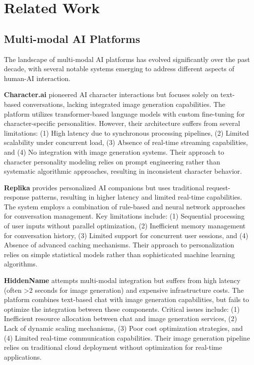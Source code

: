 \documentclass[conference]{IEEEtran}
\begin{document}
\section{Related Work}

\subsection{Multi-modal AI Platforms}
The landscape of multi-modal AI platforms has evolved significantly over the past decade, with several notable systems emerging to address different aspects of human-AI interaction.

\textbf{Character.ai} pioneered AI character interactions but focuses solely on text-based conversations, lacking integrated image generation capabilities. The platform utilizes transformer-based language models with custom fine-tuning for character-specific personalities. However, their architecture suffers from several limitations: (1) High latency due to synchronous processing pipelines, (2) Limited scalability under concurrent load, (3) Absence of real-time streaming capabilities, and (4) No integration with image generation systems. Their approach to character personality modeling relies on prompt engineering rather than systematic algorithmic approaches, resulting in inconsistent character behavior.

\textbf{Replika} provides personalized AI companions but uses traditional request-response patterns, resulting in higher latency and limited real-time capabilities. The system employs a combination of rule-based and neural network approaches for conversation management. Key limitations include: (1) Sequential processing of user inputs without parallel optimization, (2) Inefficient memory management for conversation history, (3) Limited support for concurrent user sessions, and (4) Absence of advanced caching mechanisms. Their approach to personalization relies on simple statistical models rather than sophisticated machine learning algorithms.

\textbf{HiddenName} attempts multi-modal integration but suffers from high latency (often >2 seconds for image generation) and expensive infrastructure costs. The platform combines text-based chat with image generation capabilities, but fails to optimize the integration between these components. Critical issues include: (1) Inefficient resource allocation between chat and image generation services, (2) Lack of dynamic scaling mechanisms, (3) Poor cost optimization strategies, and (4) Limited real-time communication capabilities. Their image generation pipeline relies on traditional cloud deployment without optimization for real-time applications.
\end{document}
